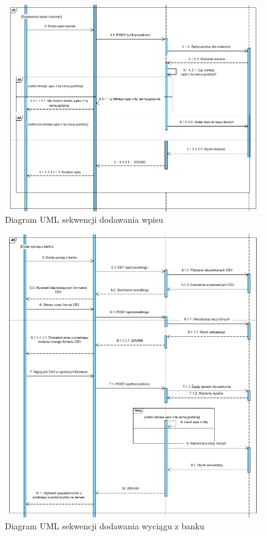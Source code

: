 \documentclass{article}
\begin{document}
	\begin{figure}[H]
		
		\hspace*{-3cm} 
		\includegraphics[scale=0.8]{assets/umlSEQ3.png}
		\caption[]{Diagram UML sekwencji dodawania wpisu}
		\label{fig:umlwpr}
	\end{figure} 
	\begin{figure}[H]
		
		\hspace*{-2cm} 
		\includegraphics[scale=0.9]{assets/umlSEQ4.png}
		\caption[]{Diagram UML sekwencji dodawania wyciągu z banku}
		\label{fig:umlwpb}
	\end{figure}
\end{document}

